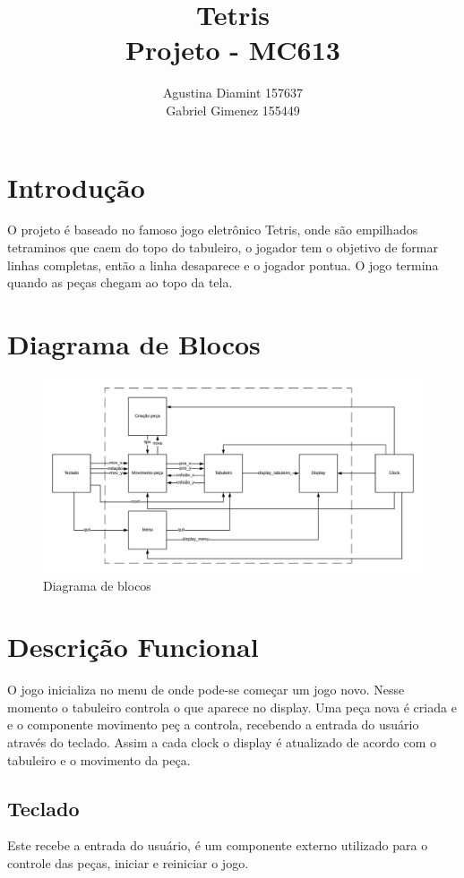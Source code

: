 \documentclass[a4paper,11pt]{article}
\begin{document}
\title{Tetris\\
	Projeto - MC613}
\author{Agustina Diamint 157637\\
 Gabriel Gimenez 155449}
\maketitle
\section{Introdu\c{c}\~ao}
O projeto \'e baseado no famoso jogo eletr\^onico Tetris, onde s\~ao empilhados tetraminos que caem do topo do tabuleiro, o jogador tem o objetivo de formar linhas completas, ent\~ao a linha desaparece e o jogador pontua. O jogo termina quando as pe\c{c}as chegam ao topo da tela.

\section{Diagrama de Blocos}
\begin{figure}[!htb]
\centering
\includegraphics[width=\textwidth]{Diagrama_de_blocos}
\caption{Diagrama de blocos}
\end{figure}

\section{Descri\c{c}\~ao Funcional}
O jogo inicializa no menu de onde pode-se come\c{c}ar um jogo novo. Nesse momento o tabuleiro controla o que aparece no display. Uma pe\c{c}a nova \'e criada e e o componente  movimento pe\c{c} a controla, recebendo a entrada do usu\'ario atrav\'es do teclado. Assim a cada clock o display \'e atualizado de acordo com o tabuleiro e o movimento da pe\c{c}a.

\subsection{Teclado}
Este recebe a entrada do usu\'ario, \'e um componente externo utilizado para o controle das pe\c{c}as, iniciar e reiniciar o jogo. 
\end{document}
